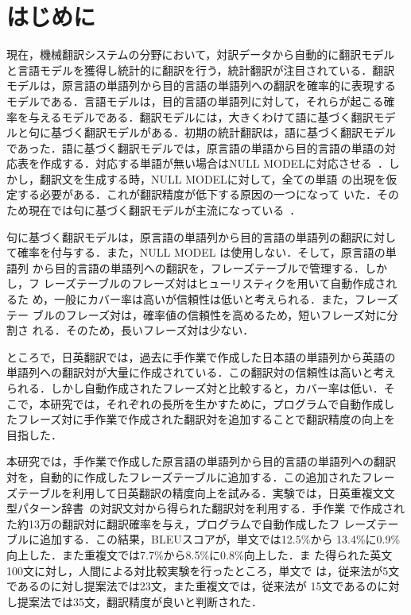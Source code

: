 \documentclass[japanese]{jnlp_1.4}
\begin{document}
\maketitle


\section{はじめに}

現在，機械翻訳システムの分野において，対訳データから自動的に翻訳モデル
と言語モデルを獲得し統計的に翻訳を行う，統計翻訳が注目されている．翻訳
モデルは，原言語の単語列から目的言語の単語列への翻訳を確率的に表現する
モデルである．言語モデルは，目的言語の単語列に対して，それらが起こる確
率を与えるモデルである．翻訳モデルには，大きくわけて語に基づく翻訳モデ
ルと句に基づく翻訳モデルがある．初期の統計翻訳は，語に基づく翻訳モデル
であった．語に基づく翻訳モデルでは，原言語の単語から目的言語の単語の対
応表を作成する．対応する単語が無い場合はNULL MODELに対応させる~\cite{IBM}．しかし，翻訳文を生成する時，NULL MODELに対して，全ての単語
の出現を仮定する必要がある．これが翻訳精度が低下する原因の一つになって
いた．そのため現在では句に基づく翻訳モデルが主流になっている~\cite{PSMT}．

句に基づく翻訳モデルは，原言語の単語列から目的言語の単語列の翻訳に対し
て確率を付与する．また，NULL MODEL は使用しない．そして，原言語の単語列
から目的言語の単語列への翻訳を，フレーズテーブルで管理する．しかし，フ
レーズテーブルのフレーズ対はヒューリスティクを用いて自動作成されるた
め，一般にカバー率は高いが信頼性は低いと考えられる．また，フレーズテー
ブルのフレーズ対は，確率値の信頼性を高めるため，短いフレーズ対に分割さ
れる．そのため，長いフレーズ対は少ない．

ところで，日英翻訳では，過去に手作業で作成した日本語の単語列から英語の
単語列への翻訳対が大量に作成されている．この翻訳対の信頼性は高いと考え
られる．しかし自動作成されたフレーズ対と比較すると，カバー率は低い．そ
こで，本研究では，それぞれの長所を生かすために，プログラムで自動作成し
たフレーズ対に手作業で作成された翻訳対を追加することで翻訳精度の向上を
目指した．

本研究では，手作業で作成した原言語の単語列から目的言語の単語列への翻訳
対を，自動的に作成したフレーズテーブルに追加する．この追加されたフレー
ズテーブルを利用して日英翻訳の精度向上を試みる．実験では，日英重複文文
型パターン辞書~\cite{tori}の対訳文対から得られた翻訳対を利用する．手作業
で作成された約13万の翻訳対に翻訳確率を与え，プログラムで自動作成したフ
レーズテーブルに追加する．この結果，BLEUスコアが，単文では12.5\%から
13.4\%に0.9\%向上した．また重複文では7.7\%から8.5\%に0.8\%向上した．ま
た得られた英文100文に対し，人間による対比較実験を行ったところ，単文で
は，従来法が5文であるのに対し提案法では23文，また重複文では，従来法が
15文であるのに対し提案法では35文，翻訳精度が良いと判断された．
\end{document}
